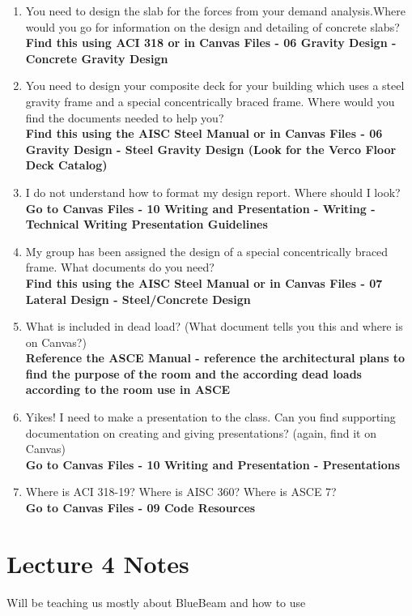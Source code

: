 \documentclass{report} %
\begin{document}
\begin{enumerate}
    \item You need to design the slab for the forces from your demand analysis.Where would you go for information on the design and detailing of concrete slabs? \\
    \textbf{Find this using ACI 318 or in Canvas Files - 06 Gravity Design - Concrete Gravity Design}

    \item You need to design your composite deck for your building which uses a steel gravity frame and a special concentrically braced frame. Where would you find the documents needed to help you? \\
    \textbf{Find this using the AISC Steel Manual or in Canvas Files - 06 Gravity Design - Steel Gravity Design (Look for the Verco Floor Deck Catalog)}

    \item I do not understand how to format my design report. Where should I look? \\
    \textbf{Go to Canvas Files - 10 Writing and Presentation - Writing - Technical Writing Presentation Guidelines}

    \item My group has been assigned the design of a special concentrically braced frame. What documents do you need?\\
    \textbf{Find this using the AISC Steel Manual or in Canvas Files - 07 Lateral Design - Steel/Concrete Design}
    
    \item What is included in dead load? (What document tells you this and where is on Canvas?) \\
    \textbf{Reference the ASCE Manual - reference the architectural plans to find the purpose of the room and the according dead loads according to the room use in ASCE}

    \item Yikes! I need to make a presentation to the class. Can you find supporting documentation on creating and giving presentations? (again, find it on Canvas) \\
    \textbf{Go to Canvas Files - 10 Writing and Presentation - Presentations}

    \item Where is ACI 318-19? Where is AISC 360? Where is ASCE 7? \\
    \textbf{Go to Canvas Files - 09 Code Resources}

\end{enumerate}

\section*{Lecture 4 Notes}
Will be teaching us mostly about BlueBeam and how to use
\end{document}
